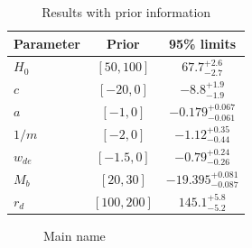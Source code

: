 \documentclass[preprint]{aastex631}
\begin{document}
\begin{table}
    \centering
    \begin{tabular} { l  c  c}
        \hline\hline
        Parameter & Prior & 95\% limits\\
        \hline
        {\boldmath$H_0            $} & $[50, 100]$ & $67.7^{+2.6}_{-2.7}$ \\
        
        {\boldmath$c              $} & $[-20, 0]$ & $-8.8^{+1.9}_{-1.9}$ \\
        
        {\boldmath$a              $} & $[-1, 0]$ & $-0.179^{+0.067}_{-0.061}$ \\
        
        {\boldmath$1/m            $} & $[-2, 0]$ & $-1.12^{+0.35}_{-0.44}$ \\
        
        {\boldmath$w_{de}         $} & $[-1.5, 0]$ & $-0.79^{+0.24}_{-0.26}$ \\
        
        {\boldmath$M_b            $} & $[20, 30]$ & $-19.395^{+0.081}_{-0.087}$ \\
        
        {\boldmath$r_d            $} & $[100, 200]$ & $145.1^{+5.8}_{-5.2}$ \\
        \hline
    \end{tabular}
    \caption{Results with prior information}
    \label{tab:results}
\end{table}

    
\begin{figure}[h]
    \centering
    \caption{Main name}
    \label{Fig.main}
\end{figure}
\end{document}
